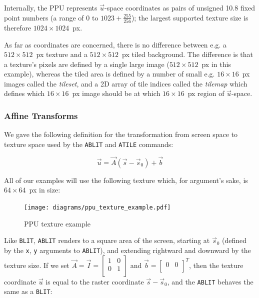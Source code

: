 Internally, the PPU represents $\vec{u}$-space coordinates as pairs of unsigned 10.8 fixed point numbers (a range of $0$ to $1023 + \frac{255}{256}$); the largest supported texture size is therefore $1024 \times 1024$~px.

As far as coordinates are concerned, there is no difference between e.g. a $512\times 512$~px texture and a $512\times 512$~px tiled background. The difference is that a texture's pixels are defined by a single large image ($512 \times 512$~px in this example), whereas the tiled area is defined by a number of small e.g. $16 \times 16$~px images called the {\it tileset}, and a 2D array of tile indices called the {\it tilemap} which defines which $16 \times 16$~px image should be at which $16 \times 16$~px region of $\vec{u}$-space.

\subsubsection*{Affine Transforms}
\label{section:affine_transform}

We gave the following definition for the transformation from screen space to texture space used by the {\tt ABLIT} and {\tt ATILE} commands:

\[
\vec{u} = \vec{A}(\vec{s} - \vec{s}_0) + \vec{b}
\]

All of our examples will use the following texture which, for argument's sake, is $64 \times 64$~px in size:

\begin{figure}[H]
\centering
\caption{PPU texture example}
\label{diagram:ppu_texture_example}
\texttt{[image: diagrams/ppu\_texture\_example.pdf]}
\end{figure}


Like {\tt BLIT}, {\tt ABLIT} renders to a square area of the screen, starting at $\vec{s}_0$ (defined by the {\tt x}, {\tt y} arguments to {\tt ABLIT}), and extending rightward and downward by the texture size.  If we set $\vec{A} = \vec{I} = \begin{bmatrix} 1 & 0 \\ 0 & 1 \\ \end{bmatrix}$ and $\vec{b} = \begin{bmatrix} 0 & 0 \\ \end{bmatrix}^T$, then the texture coordinate $\vec{u}$ is equal to the raster coordinate $\vec{s}-\vec{s}_0$, and the {\tt ABLIT} behaves the same as a {\tt BLIT}:

